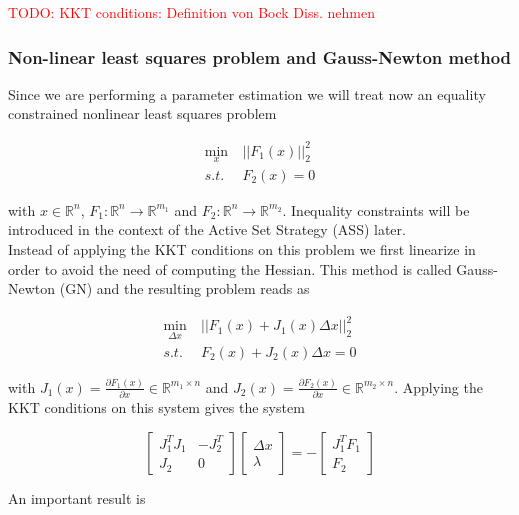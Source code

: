 \documentclass{scrartcl}[12pt, halfparskip]
\newcommand{\todo}[1]{\textcolor{red}{TODO: #1}}
\begin{document}
\todo{KKT conditions: Definition von Bock Diss. nehmen}

\subsubsection{Non-linear least squares problem and Gauss-Newton method}
\label{sec:Gauss_Newton}
Since we are performing a parameter estimation we will treat now an equality constrained nonlinear least squares problem

\begin{align}
	\min_x \ & || F_1(x) ||_2^2 \\
	s.t. \ & F_2(x) = 0 \nonumber
\end{align}

with $x \in \mathbb{R}^n$, $F_1: \mathbb{R}^n \rightarrow \mathbb{R}^{m_1}$ and $F_2: \mathbb{R}^n \rightarrow \mathbb{R}^{m_2}$. Inequality constraints will be introduced in the context of the Active Set Strategy (ASS) later. \\
Instead of applying the KKT conditions on this problem we first linearize in order to avoid the need of computing the Hessian. This method is called Gauss-Newton (GN) and the resulting problem reads as

\begin{align}
\min_{\Delta x} \ & || F_1(x) + J_1(x) \Delta x ||_2^2 \\
s.t. \ & F_2(x) + J_2(x) \Delta x = 0 \nonumber
\end{align}

with $J_1(x) = \frac{\partial F_1(x)}{\partial x} \in \mathbb{R}^{m_1 \times n}$ and $J_2(x) = \frac{\partial F_2(x)}{\partial x} \in \mathbb{R}^{m_2 \times n}$. Applying the KKT conditions on this system gives the system

\begin{equation}
	\begin{bmatrix}
		J_1^T J_1 & -J_2^T \\
		J_2 & 0
	\end{bmatrix}
	\begin{bmatrix}
		\Delta x \\
		\lambda
	\end{bmatrix}
	= -
	\begin{bmatrix}
	J_1^T F_1 \\
	F_2
	\end{bmatrix}
	\label{eq:GN_KKT_system}
\end{equation}


An important result is
\end{document}
